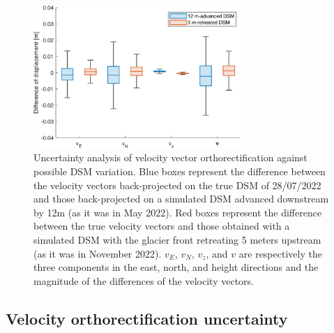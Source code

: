 \begin{figure}[ht]
  \centering
  \includegraphics[width=0.7\textwidth]{4_velocity_ortortect_uncertainty.png}
  \caption{Uncertainty analysis of velocity vector orthorectification against possible
    DSM variation. Blue boxes represent the difference between the velocity vectors
    back-projected on the true DSM of 28/07/2022 and those back-projected on a simulated
    DSM advanced downstream by 12m (as it was in May 2022).
    Red boxes represent the difference between the true velocity vectors and those
    obtained with a simulated DSM with the glacier front retreating 5 meters upstream
    (as it was in November 2022).
    \(v_E\), \(v_N\), \(v_z\), and \(v\) are respectively the three components in the
    east, north, and height directions and the magnitude of the differences of the
    velocity vectors.
  }
  \label{fig:4:velocity_ortortect_uncertainty}
\end{figure}

\subsection{Velocity orthorectification uncertainty}\label{sec:4:res_velocity_uncertainty}

